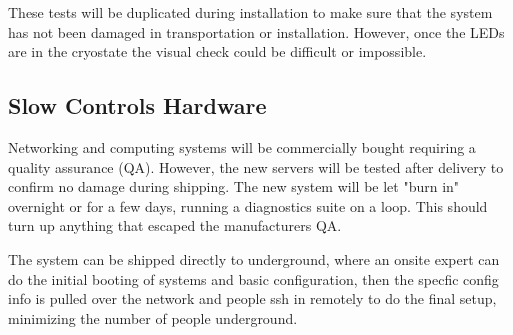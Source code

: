 These tests will be duplicated during
installation to make sure that the system has
not been damaged in transportation or installation. However, once
the LEDs are in the cryostate the visual check could be difficult or impossible.


\subsection{Slow Controls Hardware}
\label{sec:fdsp-slow-cryo-qc-sc-hard}

Networking and computing systems will be commercially bought requiring a quality assurance (QA). However, the new servers will be tested after delivery to confirm no damage during shipping. The new system will be let "burn in" overnight or for a few days, running a diagnostics suite on a loop. This should turn up anything that escaped the manufacturers QA.

The system can be shipped directly to underground, where an onsite expert can do the initial booting of systems and basic configuration, then the specfic
config info is pulled over the network and people ssh in remotely to do
the final setup, minimizing the number of people underground.

 
